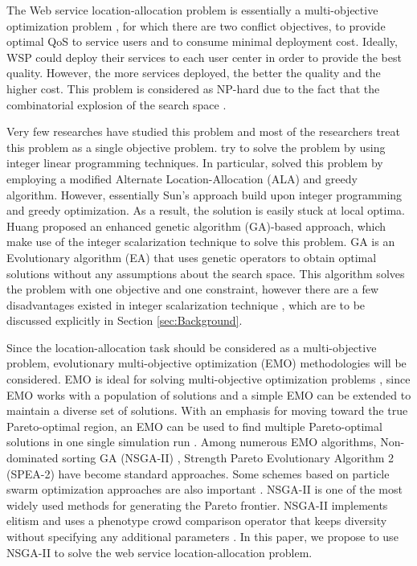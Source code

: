 \documentclass{llncs}
\begin{document}
The Web service location-allocation problem is essentially a multi-objective optimization problem \cite{Multiobjective}, for which there are two conflict objectives, to provide optimal 
QoS to service users and to consume minimal deployment cost.
Ideally, WSP could deploy their services to each user center in order to provide the best quality.
However, the more services deployed, the better the quality and the higher cost. 
This problem is considered as NP-hard due to the fact that the combinatorial explosion of the search space \cite{Vanrompay}. 


Very few researches have studied this problem and most of the researchers treat this problem as a single objective problem.
\cite{Aboolian} \cite{Sun} try to solve the problem by using integer linear programming techniques.
In particular, \cite{Sun} solved this problem by employing a modified Alternate Location-Allocation (ALA) and greedy algorithm. 
However, essentially Sun's approach build upon integer programming and greedy optimization. 
As a result, the solution is easily stuck at local optima.
Huang \cite{EnhancedGenetic} proposed an enhanced genetic algorithm (GA)-based approach, which make use of the integer scalarization technique to solve this problem.
GA \cite{man1996genetic} is an Evolutionary algorithm (EA) that uses genetic operators to obtain optimal solutions without any assumptions about the search space.
This algorithm solves the problem with one objective and one constraint, however there are a few disadvantages existed in
integer scalarization technique \cite{Multiobjective}, which are to be discussed explicitly in Section \ref{sec:Background}.

Since the location-allocation task should be considered as a multi-objective problem, evolutionary multi-objective optimization (EMO) methodologies will be considered.
EMO is ideal for solving multi-objective optimization problems \cite{key:article}, since EMO works with a population of solutions and 
a simple EMO can be extended to maintain a diverse set of solutions.
With an emphasis for moving toward the true Pareto-optimal region, an EMO can be used to find multiple Pareto-optimal solutions in 
one single simulation run \cite{OptimizationElectrical}. Among numerous EMO algorithms,
Non-dominated sorting GA (NSGA-II) \cite{996017}, Strength Pareto Evolutionary Algorithm 2 (SPEA-2) \cite{Deb} have become standard approaches. 
Some schemes based on particle swarm optimization approaches are also important \cite{Elhossini} \cite{Huang}.
NSGA-II is one of the most widely used methods for generating the Pareto frontier. 
NSGA-II implements elitism and uses a phenotype crowd comparison operator that keeps diversity without specifying any additional parameters \cite{Deb06referencepoint}.
In this paper, we propose to use NSGA-II to solve the web service location-allocation problem.
\end{document}
